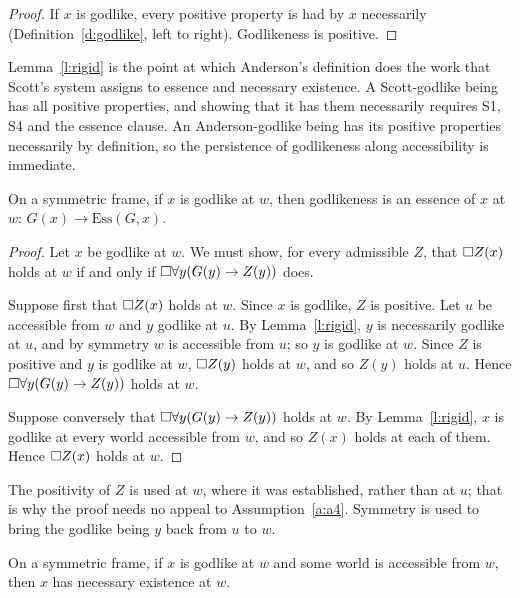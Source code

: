 \documentclass{situationist-preprint}
\newcommand{\Ess}{\mathrm{Ess}}
\begin{document}
\begin{proof}
If $x$ is godlike, every positive property is had by $x$ necessarily (Definition~\ref{d:godlike}, left to right). Godlikeness is positive.
\end{proof}

Lemma~\ref{l:rigid} is the point at which Anderson's definition does the work that Scott's system assigns to essence and necessary existence. A Scott-godlike being has all positive properties, and showing that it has them necessarily requires S1, S4 and the essence clause. An Anderson-godlike being has its positive properties necessarily by definition, so the persistence of godlikeness along accessibility is immediate.

\begin{lemma}[Essence]\label{l:essence}
On a symmetric frame, if $x$ is godlike at $w$, then godlikeness is an essence of $x$ at $w$: $G(x) \to \Ess(G,x)$.
\end{lemma}

\begin{proof}
Let $x$ be godlike at $w$. We must show, for every admissible $Z$, that $\mathord{\Box} Z(x)$ holds at $w$ if and only if $\mathord{\Box}\forall y(G(y) \to Z(y))$ does.

Suppose first that $\mathord{\Box} Z(x)$ holds at $w$. Since $x$ is godlike, $Z$ is positive. Let $u$ be accessible from $w$ and $y$ godlike at $u$. By Lemma~\ref{l:rigid}, $y$ is necessarily godlike at $u$, and by symmetry $w$ is accessible from $u$; so $y$ is godlike at $w$. Since $Z$ is positive and $y$ is godlike at $w$, $\mathord{\Box} Z(y)$ holds at $w$, and so $Z(y)$ holds at $u$. Hence $\mathord{\Box}\forall y(G(y) \to Z(y))$ holds at $w$.

Suppose conversely that $\mathord{\Box}\forall y(G(y) \to Z(y))$ holds at $w$. By Lemma~\ref{l:rigid}, $x$ is godlike at every world accessible from $w$, and so $Z(x)$ holds at each of them. Hence $\mathord{\Box} Z(x)$ holds at $w$.
\end{proof}

The positivity of $Z$ is used at $w$, where it was established, rather than at $u$; that is why the proof needs no appeal to Assumption~\ref{a:a4}. Symmetry is used to bring the godlike being $y$ back from $u$ to $w$.

\begin{lemma}\label{l:ne}
On a symmetric frame, if $x$ is godlike at $w$ and some world is accessible from $w$, then $x$ has necessary existence at $w$.
\end{lemma}
\end{document}
